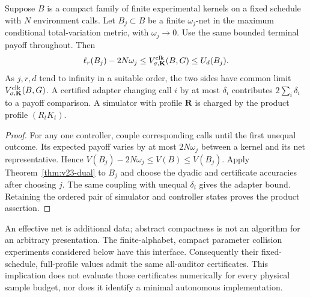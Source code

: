 \begin{corollary}
\label{cor:v23-compact}
Suppose $B$ is a compact family of finite experimental kernels on a fixed
schedule with $N$ environment calls. Let $B_j\subset B$ be a finite
$\omega_j$-net in the maximum conditional total-variation metric, with
$\omega_j\to0$. Use the same bounded terminal payoff throughout. Then
\begin{equation}\label{eq:v23-net-dual}
 \ell_r(B_j)-2N\omega_j
 \le V^{\rm clk}_{\sigma,\mathbf K}(B,G)
 \le U_d(B_j).
\end{equation}
As $j,r,d$ tend to infinity in a suitable order, the two sides have common
limit $V^{\rm clk}_{\sigma,\mathbf K}(B,G)$. A certified adapter changing
call $i$ by at most $\delta_i$ contributes
$2\sum_i\delta_i$ to a payoff comparison. A simulator with profile
$\mathbf R$ is charged by the product profile $(R_tK_t)$.
\end{corollary}
\begin{proof}
For any one controller, couple corresponding calls until the first
unequal outcome. Its expected payoff varies by at most $2N\omega_j$
between a kernel and its net representative. Hence
$V(B_j)-2N\omega_j\le V(B)\le V(B_j)$. Apply
Theorem~\ref{thm:v23-dual} to $B_j$ and choose the dyadic and certificate
accuracies after choosing $j$. The same coupling with unequal
$\delta_i$ gives the adapter bound. Retaining the ordered pair of
simulator and controller states proves the product assertion.
\end{proof}

An effective net is additional data; abstract compactness is not an
algorithm for an arbitrary presentation. The finite-alphabet, compact
parameter collision experiments considered below have this interface.
Consequently their fixed-schedule, full-profile values admit the same
all-auditor certificates. This implication does not evaluate those
certificates numerically for every physical sample budget, nor does it
identify a minimal autonomous implementation.
